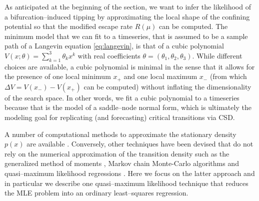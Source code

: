As anticipated at the beginning of the section, we want to infer the likelihood of a bifurcation--induced tipping by approximating the local shape of the confining potential so that the modified escape rate $R(\mu)$ can be computed.
The minimum model that we can fit to a timeseries, that is assumed to be a sample path of a Langevin equation \eqref{eq:langevin}, is that of a cubic polynomial $V(x;\theta) = \sum_{k=1}^{3}\theta_{k}x^{k}$ with real coefficients $\theta=(\theta_{1},\theta_{2},\theta_{3})$.
While different choices are available, a cubic polynomial is minimal in the sense that it allows for the presence of one local minimum $x_+$ and one local maximum $x_-$ (from which $\Delta V = V(x_-) - V(x_+)$ can be computed) without inflating the dimensionality of the search space.
In other words, we fit a cubic polynomial to a timeseries because that is the model of a saddle--node normal form, which is ultimately the modeling goal for replicating (and forecasting) critical transitions via CSD.

A number of computational methods to approximate the stationary density $p(x)$ are available \cite{Pedersen1995, Jensen2002, Sahalia2002}.
Conversely, other techniques have been devised that do not rely on the numerical approximation of the transition density such as the generalized method of moments \cite{Hansen1982}, Markov chain Monte-Carlo algorithms \cite{Roberts2001,Alexander2005} and quasi--maximum likelihood regressions \cite{Castelle1986, Yoshida1992}.
Here we focus on the latter approach and in particular we describe one quasi--maximum likelihood technique that reduces the MLE problem into an ordinary least--squares regression.

